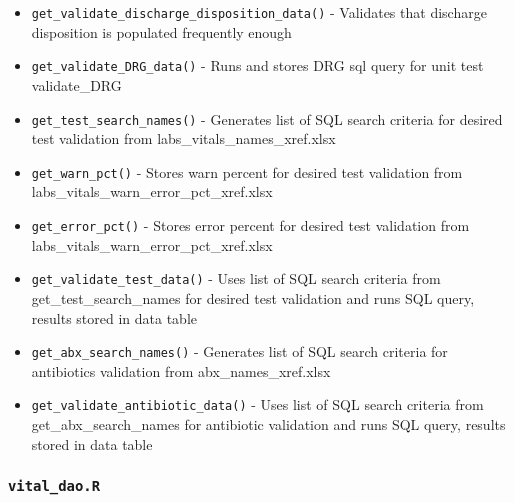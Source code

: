 \documentclass[
]{book}
\providecommand{\tightlist}{%
  \setlength{\itemsep}{0pt}\setlength{\parskip}{0pt}}
\begin{document}
\begin{itemize}
\tightlist
\item
  \texttt{get\_validate\_discharge\_disposition\_data()} - Validates that discharge disposition is populated frequently enough
\item
  \texttt{get\_validate\_DRG\_data()} - Runs and stores DRG sql query for unit test validate\_DRG
\item
  \texttt{get\_test\_search\_names()} - Generates list of SQL search criteria for desired test validation from labs\_vitals\_names\_xref.xlsx
\item
  \texttt{get\_warn\_pct()} - Stores warn percent for desired test validation from labs\_vitals\_warn\_error\_pct\_xref.xlsx
\item
  \texttt{get\_error\_pct()} - Stores error percent for desired test validation from labs\_vitals\_warn\_error\_pct\_xref.xlsx
\item
  \texttt{get\_validate\_test\_data()} - Uses list of SQL search criteria from get\_test\_search\_names for desired test validation and runs SQL query, results stored in data table
\item
  \texttt{get\_abx\_search\_names()} - Generates list of SQL search criteria for antibiotics validation from abx\_names\_xref.xlsx
\item
  \texttt{get\_validate\_antibiotic\_data()} - Uses list of SQL search criteria from get\_abx\_search\_names for antibiotic validation and runs SQL query, results stored in data table
\end{itemize}

\hypertarget{vital_dao.r-1}{%
\subsubsection{\texorpdfstring{\texttt{vital\_dao.R}}{vital\_dao.R}}\label{vital_dao.r-1}}
\end{document}
